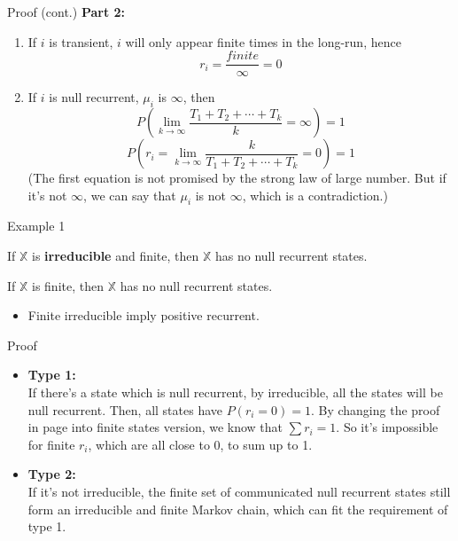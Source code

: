 \documentclass[mathserif]{beamer}
\begin{document}
\begin{frame}{Proof (cont.)}
	\textbf{Part 2:} \\
	\begin{enumerate}
	\item If $i$ is transient, $i$ will only appear finite times in the long-run, hence
		\[
		r_i = \frac{finite}{\infty} = 0
		\]
	\item If $i$ is null recurrent, $\mu_i$ is $\infty$, then
		\[
		P\left( \lim_{k\to\infty} \frac{T_1 + T_2 + \cdots + T_k}{k} = \infty \right) = 1
		\]
		\[
		P\left( r_i = \lim_{k\to\infty} \frac{k}{T_1 + T_2 + \cdots + T_k} = 0 \right) = 1
		\]
		(The first equation is not promised by the strong law of large number.
		But if it's not $\infty$, we can say that $\mu_i$ is not $\infty$, which is a contradiction.)
	\end{enumerate}
\end{frame}

\begin{frame}{Example 1}\label{finite_pos_rec}
	\begin{example}[type 1]
	If $\mathbb{X}$ is \textbf{irreducible} and finite, then $\mathbb{X}$ has no null recurrent states.
	\end{example}
	\begin{example}[type 2]
	If $\mathbb{X}$ is finite, then $\mathbb{X}$ has no null recurrent states.
	\end{example}
	\begin{itemize}
	\item Finite irreducible imply positive recurrent.
	\end{itemize}
\end{frame}

\begin{frame}{Proof}
	\begin{itemize}
	\item \textbf{Type 1:}\\
		If there's a state which is null recurrent, by irreducible, all the states will be null recurrent.
		Then, all states have $P(r_i = 0) = 1$.
		By changing the proof in page \pageref{proportion_sum} into finite states version, 
		we know that $\sum r_i = 1$.
		So it's impossible for finite $r_i$, which are all close to 0, to sum up to 1.
	\item \textbf{Type 2:}\\
		If it's not irreducible, the finite set of communicated null recurrent states still form an irreducible and finite Markov chain, which can fit the requirement of type 1.
	\end{itemize}
\end{frame}
\end{document}
